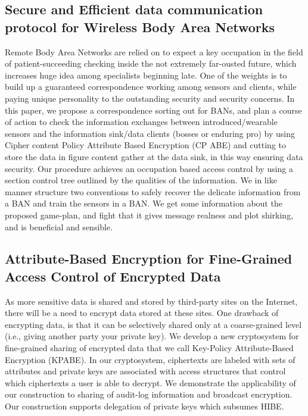 \documentclass[BTech]{srmuthesis}
\begin{document}
\subsection{Secure and Efficient data communication protocol for Wireless Body Area Networks}
Remote Body Area Networks are relied on to expect a key occupation in the field of patient-succeeding checking inside the not extremely far-ousted future, which increases huge idea among specialists beginning late. One of the weights is to build up a guaranteed correspondence working among sensors and clients, while paying unique personality to the outstanding security and security concerns. In this paper, we propose a correspondence sorting out for BANs, and plan a course of action to check the information exchanges between introduced/wearable sensors and the information sink/data clients (bosses or enduring pro) by using Cipher content Policy Attribute Based Encryption (CP ABE) and cutting to store the data in figure content gather at the data sink, in this way ensuring data security. Our procedure achieves an occupation based access control by using a section control tree outlined by the qualities of the information. We in like manner structure two conventions to safely recover the delicate information from a BAN and train the sensors in a BAN. We get some information about the proposed game-plan, and fight that it gives message realness and plot shirking, and is beneficial and sensible.
\subsection{Attribute-Based Encryption for Fine-Grained Access Control of Encrypted Data}
As more sensitive data is shared and stored by third-party sites on the Internet, there will be a need to encrypt data stored at these sites. One drawback of encrypting data, is that it can be selectively shared only at a coarse-grained level (i.e., giving another party your private key). We develop a new cryptosystem for fine-grained sharing of encrypted data that we call Key-Policy Attribute-Based Encryption (KPABE). In our cryptosystem, ciphertexts are labeled with sets of attributes and private keys are associated with access structures that control which ciphertexts a user is able to decrypt. We demonstrate the applicability of our construction to sharing of audit-log information and broadcast encryption. Our construction supports delegation of private keys which subsumes  \ac{HIBE}.
\end{document}
